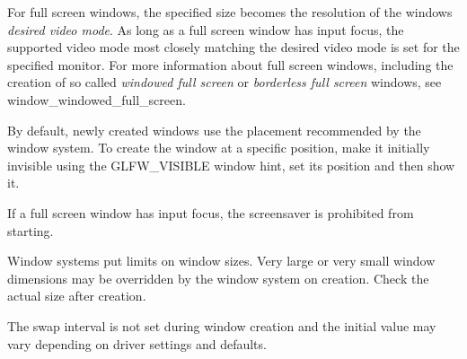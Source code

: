 For full screen windows, the specified size becomes the resolution of the window\textquotesingle{}s {\itshape desired video mode}. As long as a full screen window has input focus, the supported video mode most closely matching the desired video mode is set for the specified monitor. For more information about full screen windows, including the creation of so called {\itshape windowed full screen} or {\itshape borderless full screen} windows, see window\+\_\+windowed\+\_\+full\+\_\+screen.

By default, newly created windows use the placement recommended by the window system. To create the window at a specific position, make it initially invisible using the G\+L\+F\+W\+\_\+\+V\+I\+S\+I\+B\+L\+E window hint, set its position and then show it.

If a full screen window has input focus, the screensaver is prohibited from starting.

Window systems put limits on window sizes. Very large or very small window dimensions may be overridden by the window system on creation. Check the actual size after creation.

The swap interval is not set during window creation and the initial value may vary depending on driver settings and defaults.


